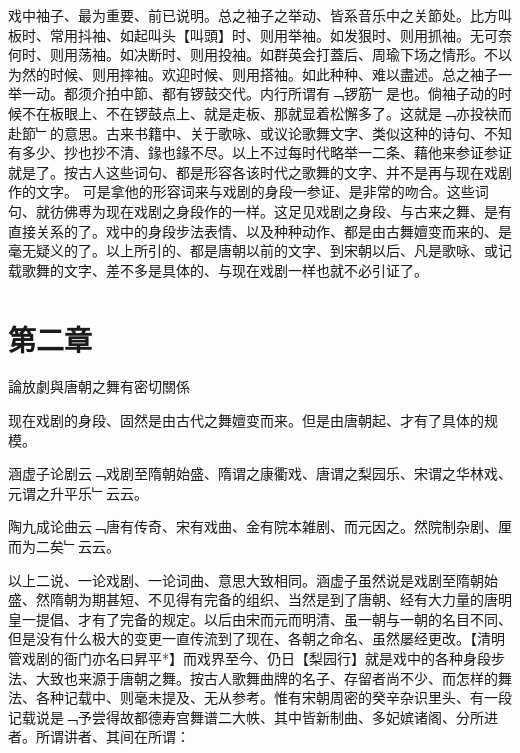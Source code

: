 \documentclass{zhvt-classic}
\begin{document}
戏中袖子、最为重要、前已说明。总之袖子之举动、皆系音乐中之关節处。比方叫板时、常用抖袖、如起叫头【叫頭】时、则用举袖。如发狠时、则用抓袖。无可奈何时、则用荡袖。如决断时、则用投袖。如群英会打蓋后、周瑜下场之情形。不以为然的时候、则用摔袖。欢迎时候、则用搭袖。如此种种、难以盡述。总之袖子一举一动。都须介拍中節、都有锣鼓交代。内行所谓有﹁锣筋﹂是也。倘袖子动的时候不在板眼上、不在锣鼓点上、就是走板、那就显着松懈多了。这就是﹁亦投袂而赴節﹂的意思。古来书籍中、关于歌咏、或议论歌舞文字、类似这种的诗句、不知有多少、抄也抄不清、䤸也䤸不尽。以上不过每时代略举一二条、藉他来参证参证就是了。按古人这些词句、都是形容各该时代之歌舞的文字、并不是再与现在戏剧作的文字。
可是拿他的形容词来与戏剧的身段一参证、是非常的吻合。这些词句、就彷佛尃为现在戏剧之身段作的一样。这足见戏剧之身段、与古来之舞、是有直接关系的了。戏中的身段步法表情、以及种种动作、都是由古舞嬗变而来的、是毫无疑义的了。以上所引的、都是唐朝以前的文字、到宋朝以后、凡是歌咏、或记载歌舞的文字、差不多是具体的、与现在戏剧一样也就不必引证了。

\chapter*{第二章}{論放劇與唐朝之舞有密切關係}   

现在戏剧的身段、固然是由古代之舞嬗变而来。但是由唐朝起、才有了具体的规模。

\begin{preface}

涵虚子论剧云﹁戏剧至隋朝始盛、隋谓之康衢戏、唐谓之梨园乐、宋谓之华林戏、元谓之升平乐﹂云云。

\end{preface}

\begin{preface}

陶九成论曲云﹁唐有传奇、宋有戏曲、金有院本雑剧、而元因之。然院制杂剧、厘而为二矣﹂云云。

\end{preface}

以上二说、一论戏剧、一论词曲、意思大致相同。涵虚子虽然说是戏剧至隋朝始盛、然隋朝为期甚短、不见得有完备的组织、当然是到了唐朝、经有大力量的唐明皇一提倡、才有了完备的规定。以后由宋而元而明清、虽一朝与一朝的名目不同、但是没有什么极大的变更一直传流到了现在、各朝之命名、虽然屡经更改。【清明管戏剧的衙门亦名曰昇平*】而戏界至今、仍日【梨园行】就是戏中的各种身段步法、大致也来源于唐朝之舞。按古人歌舞曲牌的名子、存留者尚不少、而怎样的舞法、各种记载中、则毫未提及、无从参考。惟有宋朝周密的癸辛杂识里头、有一段记载说是﹁予尝得故都德寿宫舞谱二大帙、其中皆新制曲、多妃嫔诸阁、分所进者。所谓讲者、其间在所谓：
\end{document}
